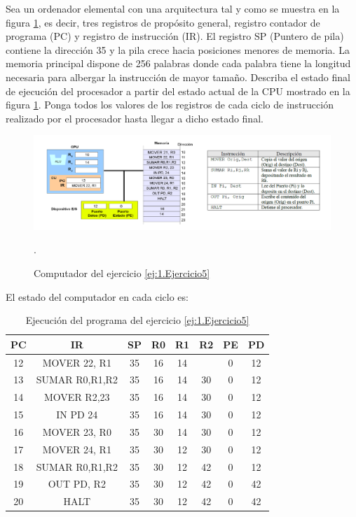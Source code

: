 \begin{ejercicio}\label{ej:1.Ejercicio5}
    Sea un ordenador elemental con una arquitectura tal y como se muestra en la figura \ref{fig:Ej5_Computador}, es decir, tres registros de propósito general, registro contador de programa (PC) y registro de instrucción (IR). El registro SP (Puntero de pila) contiene la dirección 35 y la pila crece hacia posiciones menores de memoria. La memoria principal dispone de 256 palabras donde cada palabra tiene la longitud necesaria para albergar la instrucción de mayor tamaño. Describa el estado final de ejecución del procesador a partir del estado actual de la CPU mostrado en la figura \ref{fig:Ej5_Computador}. Ponga todos los valores de los registros de cada ciclo de instrucción realizado por el procesador hasta llegar a dicho estado final.
    \begin{figure}[H]
        \centering
        \includegraphics[width=1.1\linewidth]{Imagenes/Ej5_Compuatdor.png}
        \caption{Computador del ejercicio \ref{ej:1.Ejercicio5}}.
        \label{fig:Ej5_Computador}
    \end{figure}

    El estado del computador en cada ciclo es:
    \begin{table}[H]
        \centering
        \begin{tabular}{c|c|c|c|c|c|c|c}
            PC & IR & SP & R0 & R1 & R2 & PE & PD \\ \hline
            12 & MOVER 22, R1 & 35 & 16  & 14  &  & 0 & 12 \\
            13 & SUMAR R0,R1,R2 & 35 & 16 & 14 & 30 & 0  & 12 \\
            14 & MOVER R2,23  & 35 & 16  & 14 & 30 & 0 & 12  \\
            15 & IN PD 24 & 35 & 16  & 14 & 30 & 0 & 12  \\
            16 & MOVER 23, R0  & 35 & 30  & 14 & 30 & 0 & 12  \\
            17 & MOVER 24, R1  & 35 & 30  & 12 & 30 & 0 & 12  \\
            18 & SUMAR R0,R1,R2  & 35 & 30  & 12 & 42 & 0 & 12  \\
            19 & OUT PD, R2  & 35 & 30  & 12 & 42 & 0 & 42  \\
            20 &  HALT  & 35 & 30  & 12 & 42 & 0 & 42  \\
        \end{tabular}
        \caption{Ejecución del programa del ejercicio \ref{ej:1.Ejercicio5}}
        \label{tab:Ejercicio5}
    \end{table}
    

\end{ejercicio}
